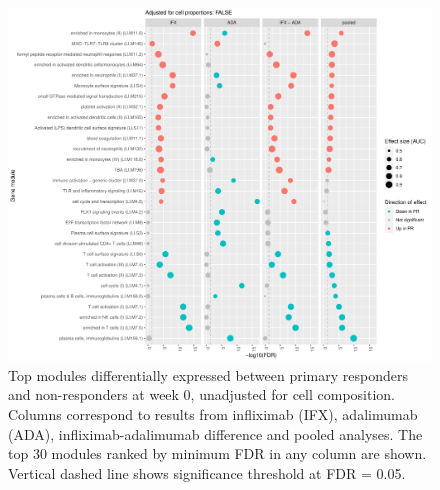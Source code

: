 \begin{figure}
    \centering
    \includegraphics[width=1.0\textwidth,page=1]{mainmatter/figures/chapter_04/plot_gene_set_enrichment.tmodCERNO_panelplot_reversed_C_1RI_1NI,C_1RA_1NA,C_(1RI_1NI)_(1RA_1NA),C_1R_1N.cell_prop_correction_FALSE.pdf}
    \caption{Top modules differentially expressed between primary responders and non-responders at week 0, unadjusted for cell composition. Columns correspond to results from infliximab (IFX), adalimumab (ADA), infliximab-adalimumab difference and pooled analyses. The top 30 modules ranked by minimum \gls{FDR} in any column are shown. Vertical dashed line shows significance threshold at FDR = 0.05.}
    \label{fig:multipants_dge_panelPlot_week_0_R_N_cellPropF}
\end{figure}

